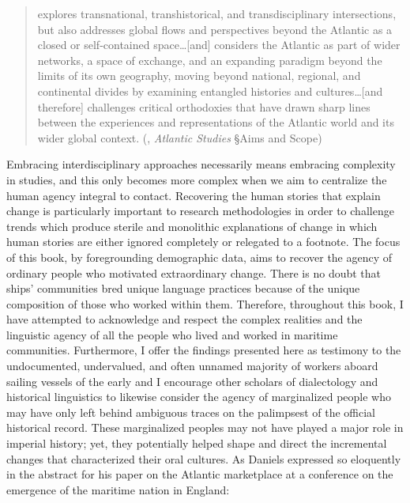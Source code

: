 \begin{quotation}
explores transnational, transhistorical, and transdisciplinary intersections, but also addresses global flows and perspectives beyond the Atlantic as a closed or self-contained space…[and] considers the Atlantic as part of wider networks, a space of exchange, and an expanding paradigm beyond the limits of its own geography, moving beyond national, regional, and continental divides by examining entangled histories and cultures…[and therefore] challenges critical orthodoxies that have drawn sharp lines between the experiences and representations of the Atlantic world and its wider global context. (\citealt{TaylorandFrancisGroup2016}, \textit{Atlantic Studies} §Aims and Scope)
\end{quotation}

Embracing interdisciplinary approaches necessarily means embracing complexity in  studies, and this only becomes more complex when we aim to centralize the human agency integral to  contact. Recovering the human stories that explain  change is particularly important to  research methodologies in order to challenge trends which produce sterile and monolithic explanations of  change in which human stories are either ignored completely or relegated to a footnote. The focus of this book, by foregrounding demographic data, aims to recover the agency of ordinary people who motivated extraordinary change. There is no doubt that ships’ communities bred unique language practices because of the unique composition of those who worked within them. Therefore, throughout this book, I have attempted to acknowledge and respect the complex realities and the linguistic agency of all the people who lived and worked in maritime communities. Furthermore, I offer the findings presented here as testimony to the undocumented, undervalued, and often unnamed majority of workers aboard sailing vessels of the early  and I encourage other scholars of dialectology and historical linguistics to likewise consider the agency of marginalized people who may have only left behind ambiguous traces on the palimpsest of the official historical record. These marginalized peoples may not have played a major role in imperial history; yet, they potentially helped shape and direct the incremental changes that characterized their oral cultures. As Daniels expressed so eloquently in the abstract for his paper on the Atlantic marketplace at a conference on the emergence of the maritime nation in England:

